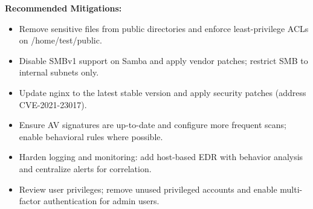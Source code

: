 \documentclass[a4paper,12pt]{article}
\begin{document}
\vspace{0.3cm}
\textbf{Recommended Mitigations:}
\begin{itemize}

    
    \item Remove sensitive files from public directories and enforce least-privilege ACLs on /home/test/public.
    
    \item Disable SMBv1 support on Samba and apply vendor patches; restrict SMB to internal subnets only.
    
    \item Update nginx to the latest stable version and apply security patches (address CVE-2021-23017).
    
    \item Ensure AV signatures are up-to-date and configure more frequent scans; enable behavioral rules where possible.
    
    \item Harden logging and monitoring: add host-based EDR with behavior analysis and centralize alerts for correlation.
    
    \item Review user privileges; remove unused privileged accounts and enable multi-factor authentication for admin users.
    

\end{itemize}

\newpage


\end{document}
